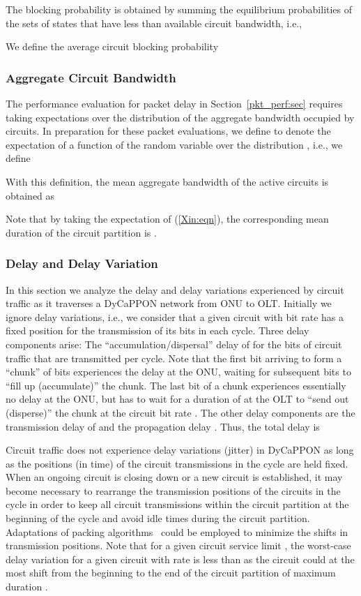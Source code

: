 \documentclass[article]{IEEEtran}
\begin{document}
The blocking probability  is obtained by summing
the equilibrium probabilities  of the sets of states
that have less than  available circuit bandwidth, i.e.,

We define the average circuit blocking probability


\subsubsection{Aggregate Circuit Bandwidth}
The performance evaluation for packet delay in
Section~\ref{pkt_perf:sec} requires taking
expectations over the distribution 
of the aggregate bandwidth  occupied by circuits.
In preparation for these packet evaluations, we define
 to denote the expectation of
a function  of the random variable  over the
distribution , i.e., we define

With this definition, the mean aggregate bandwidth of the active circuits is
obtained as

Note that by taking the expectation of (\ref{Xin:eqn}), the corresponding
mean duration of the circuit partition is
.

\subsubsection{Delay and Delay Variation}
\label{cirdel:sec}
In this section we analyze the delay and delay variations
experienced by circuit traffic as it traverses a DyCaPPON network
from ONU to OLT.
Initially we ignore delay variations, i.e., we consider
that a given circuit with bit rate  has a fixed position for
the transmission of its  bits in each cycle.
Three delay components arise:
The ``accumulation/dispersal'' delay of  for the
 bits of circuit traffic that are transmitted per cycle.
Note that the first bit arriving to form a ``chunk'' of
 bits experiences the delay  at the ONU, waiting
for subsequent bits to ``fill up (accumulate)'' the chunk.
The last bit of a chunk experiences essentially no delay at the ONU, but
has to wait for a duration of  at the OLT to ``send out (disperse)''
the chunk at the circuit bit rate .
The other delay components are the transmission delay of 
and the propagation delay .
Thus, the total delay is


Circuit traffic does not experience delay variations (jitter) in
DyCaPPON as long as the positions (in time) of the circuit transmissions
in the cycle are held fixed.
When an ongoing circuit is closing down or a new
circuit is established, it may become necessary to
rearrange the transmission positions of the circuits in the cycle in
order to keep all circuit transmissions within the circuit partition
at the beginning of the cycle and avoid idle times during
the circuit partition.
Adaptations of packing algorithms~\cite{dyck90}
could be employed to minimize the shifts in transmission positions.
Note that for a given circuit service limit ,
the worst-case delay variation for a given circuit with rate  is less than
 as the circuit could at the most shift from
the beginning to the end of the circuit partition of
maximum duration .
\end{document}
